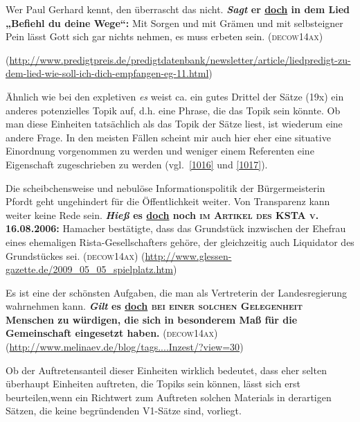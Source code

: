 \begin{exe}
	\ex\label{1015} 

	Wer Paul Gerhard kennt, den überrascht das nicht. \textbf{\textit{Sagt} er \ul{doch} in dem Lied „Befiehl du deine Wege“:} Mit Sorgen 	und mit Grämen und mit selbsteigner Pein lässt Gott sich gar nichts nehmen, es muss erbeten sein. 		
	\newline\hbox{}\hfill\hbox{\scshape(decow14ax)}
	\begin{sloppypar}
	{\scriptsize\sloppy(\url{http://www.predigtpreis.de/predigtdatenbank/newsletter/article/liedpredigt-zu-dem-lied-wie-soll-ich-dich-empfangen-eg-11.html})}\end{sloppypar}
\end{exe}									         
Ähnlich wie bei den expletiven \textit{es} weist ca. ein gutes Drittel der Sätze (19x) ein anderes potenzielles Topik auf, d.h. eine Phrase, die das  Topik sein könnte. Ob man diese Einheiten tatsächlich als das Topik der Sätze liest, ist wiederum eine andere Frage. In den meisten Fällen scheint mir auch hier eher eine situative Einordnung vorgenommen zu werden und weniger einem Referenten eine Eigenschaft zugeschrieben zu werden (vgl.\ \ref{1016} und \ref{1017}).
		
\begin{exe}
	\ex\label{1016} 

	Die scheibchensweise und nebulöse Informationspolitik der Bürgermeisterin Pfordt geht ungehindert für die Öffentlichkeit weiter. Von Transparenz kann weiter keine Rede sein. \textbf{\textit{Hieß} es \ul{doch} noch \textsc{im Artikel des KSTA v. 16.08.2006}:} Hamacher bestätigte, dass das Grundstück inzwischen der Ehefrau eines ehemaligen Rista-Gesellschafters gehöre, der gleichzeitig auch Liquidator des Grundstückes sei. 			
	\hbox{}\hfill\hbox{\scshape(decow14ax)}
	\newline
	{\scriptsize(\url{http://www.glessen-gazette.de/2009\_05\_05\_spielplatz.htm})	}
\end{exe}		

\begin{exe}
	\ex\label{1017} 

	Es ist eine der schönsten Aufgaben, die man als Vertreterin der Landesregierung wahrnehmen kann.
	\textbf{\textit{Gilt} es \ul{doch} \textsc{bei einer solchen Gelegenheit} Menschen zu würdigen, die sich in besonderem Maß für die Gemeinschaft 		eingesetzt haben.}				
	\hfill\hbox{\scshape(decow14ax)}
	\newline
	{\scriptsize(\url{http://www.melinaev.de/blog/tags....Inzest/?view=30})	}
\end{exe}						   
Ob der Auftretensanteil dieser Einheiten wirklich bedeutet, dass eher selten überhaupt Einheiten auftreten, die Topiks sein können, lässt sich erst beurteilen,\linebreak wenn ein Richtwert zum Auftreten solchen Materials in derartigen Sätzen, die keine begründenden V1-Sätze sind, vorliegt.

